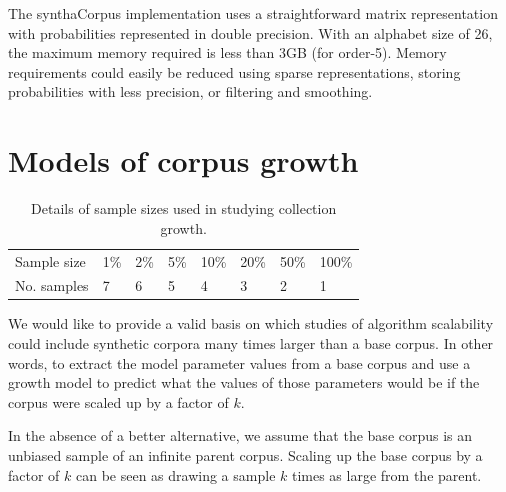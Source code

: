 \documentclass[11pt]{report}
\begin{document}
The synthaCorpus implementation uses a straightforward matrix representation with
probabilities represented in double precision.  With an alphabet size
of 26, the maximum memory required is less than 3GB (for order-5).
Memory requirements could easily be reduced using sparse
representations, storing probabilities with less precision, or 
filtering and smoothing.







\chapter{Models of corpus growth}  %
\label{GrowthModels}

\begin{table}
\centering
\label{samples}
\caption{Details of sample sizes used in studying collection growth.
\label{t:samples}}
\begin{tabular}{l|lllllll}
\hline
Sample size & 1\% & 2\% & 5\% & 10\% & 20\% & 50\% & 100\%\\
No. samples & 7 & 6 & 5 & 4 & 3 & 2 & 1\\
\hline
\end{tabular}
\end{table}

We would like to provide a valid basis on which studies of algorithm
scalability could include synthetic corpora many times larger
than a base corpus.  In other words, to extract the model parameter values from a
base corpus and use a growth model to predict what the values of those
parameters would be if the corpus were scaled up by a factor of $k$.

In the absence of a better alternative, we assume that the base corpus
is an unbiased sample of an infinite parent corpus.  Scaling up the
base corpus by a factor of $k$ can be seen as drawing a sample $k$
times as large from the parent.
\end{document}
